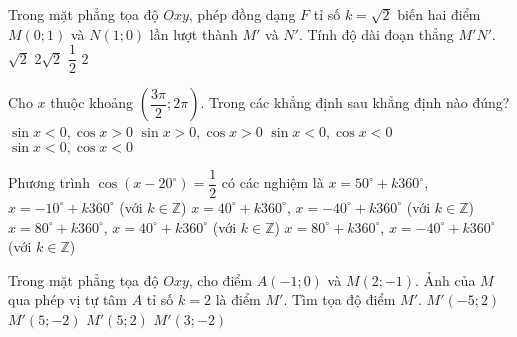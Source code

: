 \begin{ex}%
	Trong mặt phẳng tọa độ $Oxy$, phép đồng dạng $F$ tỉ số $k=\sqrt{2}$ biến hai điểm $M(0;1)$ và $N(1;0)$ lần lượt thành $M'$ và $N'$. Tính độ dài đoạn thẳng $M'N'$.
	\choice
	{$\sqrt{2}$}
	{$2\sqrt{2}$}
	{$\dfrac{1}{2}$}
	{\True $2$}
\end{ex}
\begin{ex}%
	Cho $x$ thuộc khoảng $\left(\dfrac{3\pi}{2};2\pi \right)$. Trong các khẳng định sau khẳng định nào đúng?
	\choice
	{\True $\sin x<0, \cos x>0$}
	{$\sin x>0, \cos x>0$}
	{$\sin x<0, \cos x<0$}
	{$\sin x<0, \cos x<0$}
\end{ex}
\begin{ex}%
	Phương trình $\cos(x-20^\circ)=\dfrac{1}{2}$ có các nghiệm là
	\choice
	{$x=50^\circ +k360^\circ$, $x=-10^\circ +k360^\circ$ (với $k\in \mathbb{Z}$)}
	{$x=40^\circ +k360^\circ$, $x=-40^\circ +k360^\circ$ (với $k\in \mathbb{Z}$)}
	{$x=80^\circ +k360^\circ$, $x=40^\circ +k360^\circ$ (với $k\in \mathbb{Z}$)}
	{\True $x=80^\circ +k360^\circ$, $x=-40^\circ +k360^\circ$ (với $k\in \mathbb{Z}$)}
\end{ex}
\begin{ex}%
	Trong mặt phẳng tọa độ $Oxy$, cho điểm $A(-1;0)$ và $M(2;-1)$. Ảnh của $M$ qua phép vị tự tâm $A$ tỉ số $k=2$ là điểm $M'$. Tìm tọa độ điểm $M'$.
	\choice
	{$M'(-5;2)$}
	{\True $M'(5;-2)$}
	{$M'(5;2)$}
	{$M'(3;-2)$}
\end{ex}
